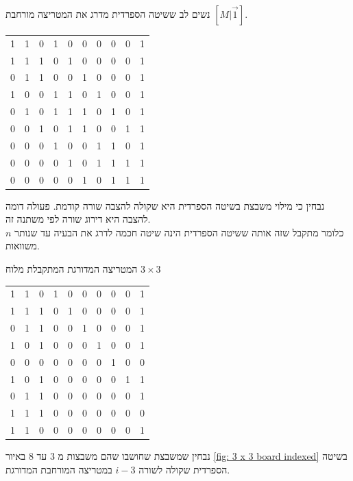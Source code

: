 \documentclass[12pt,twoside]{article}
\begin{document}
נשים לב ששיטה הספרדית מדרג את המטריצה מורחבת 
$[M | \vec{1}]$.

\begin{center}
    \begin{tabular}{|ccccccccc|c|}
        \hline
        1& 1& 0& 1& 0& 0& 0& 0& 0& 1 \\
        1& 1& 1& 0& 1& 0& 0& 0& 0& 1 \\
        0& 1& 1& 0& 0& 1& 0& 0& 0& 1 \\
        1& 0& 0& 1& 1& 0& 1& 0& 0& 1 \\
        0& 1& 0& 1& 1& 1& 0& 1& 0& 1 \\
        0& 0& 1& 0& 1& 1& 0& 0& 1& 1 \\
        0& 0& 0& 1& 0& 0& 1& 1& 0& 1 \\
        0& 0& 0& 0& 1& 0& 1& 1& 1& 1 \\
        0& 0& 0& 0& 0& 1& 0& 1& 1& 1 \\
        \hline
    \end{tabular}
\end{center}

נבחין כי מילוי משבצת 
בשיטה הספרדית היא שקולה להצבה 
שורה קודמת.
פעולה דומה להצבה היא 
דירוג שורה 
לפי משתנה זה.
\\
כלומר מתקבל שזה אותה ששיטה הספרדית הינה 
שיטה חכמה לדרג את הבעיה
עד שנותר 
$n$
משוואות.

המטריצה המדורגת המתקבלת
מלוח 
$3 \times 3$
   

\begin{center}
    \begin{tabular}{|ccccccccc|c|}
        \hline
1& 1& 0& 1& 0& 0& 0& 0& 0& 1 \\
1& 1& 1& 0& 1& 0& 0& 0& 0& 1 \\
0& 1& 1& 0& 0& 1& 0& 0& 0& 1 \\
1& 0& 1& 0& 0& 0& 1& 0& 0& 1\\
0& 0& 0& 0& 0& 0& 0& 1& 0& 0\\
1& 0& 1& 0& 0& 0& 0& 0& 1& 1\\
0& 1& 1& 0& 0& 0& 0& 0& 0& 1\\
1& 1& 1& 0& 0& 0& 0& 0& 0& 0\\
1& 1& 0& 0& 0& 0& 0& 0& 0& 1\\
        \hline
    \end{tabular}
\end{center}

נבחין שמשבצת שחושבו
שהם משבצות 
מ
$3$
עד 
$8$
באיור
\ref{fig: 3 x 3 board indexed}
בשיטה הספרדית
שקולה לשורה 
$i-3$
במטריצה המורחבת המדורגת.
\end{document}
